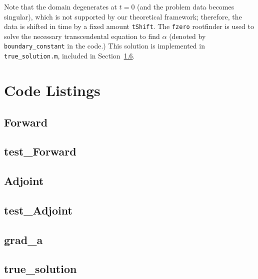 \documentclass[letterpaper, 10pt]{amsart}
\theoremstyle{definition}
\theoremstyle{remark}
\begin{document}
Note that the domain degenerates at $t=0$ (and the problem data becomes singular), which is not supported by our theoretical framework; therefore, the data is shifted in time by a fixed amount \verb+tShift+.
The \verb+fzero+ rootfinder is used to solve the necessary transcendental equation to find $\alpha$ (denoted by \verb+boundary_constant+ in the code.)
This solution is implemented in \verb+true_solution.m+, included in Section~\ref{sec:code-listing-true-solution}.


\appendix
\section{Code Listings}
{\small 
\subsection{Forward}\label{sec:code-listing-forward}


\subsection{test\_Forward}\label{sec:code-listing-test-forward}


\subsection{Adjoint}\label{sec:code-listing-adjoint}


\subsection{test\_Adjoint}\label{sec:code-listing-test-adjoint}


\subsection{grad\_a}\label{sec:code-listing-grad-s}


\subsection{true\_solution}\label{sec:code-listing-true-solution}

}
\end{document}
